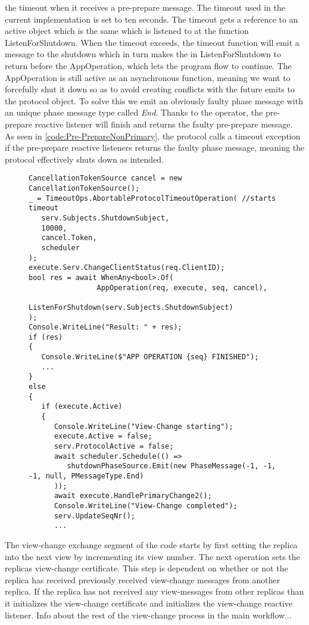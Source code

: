 the timeout when it receives a pre-prepare message. The timeout used in the current implementation is set to ten seconds. The timeout gets a reference to an active  object which is the same  which is listened to at the function ListenForShutdown. When the timeout exceeds, the timeout function will emit a message to the shutdown  which in turn makes the  in ListenForShutdown to return before the AppOperation, which lets the program flow to continue. The AppOperation is still active as an asynchronous function, meaning we want to forcefully shut it down so as to avoid creating conflicts with the future emits to the protocol  object. To solve this we emit an obviously faulty phase message with an unique phase message type called \emph{End}. Thanks to the  operator, the pre-prepare reactive listener will finish and returns the faulty pre-prepare message. As seen in \autoref{code:Pre-PrepareNonPrimary}, the protocol calls a timeout exception if the pre-prepare reactive listeners returns the faulty phase message, meaning the protocol effectively shuts down as intended.   
\begin{figure}[H]
	\centering
	\begin{lstlisting}[label = code:timeout, caption=Handling timeout for the normal protocol workflow and initiate View-Change, captionpos = b, basicstyle=\scriptsize]
CancellationTokenSource cancel = new CancellationTokenSource();
_ = TimeoutOps.AbortableProtocolTimeoutOperation( //starts timeout
   serv.Subjects.ShutdownSubject,
   10000,
   cancel.Token,
   scheduler
);
execute.Serv.ChangeClientStatus(req.ClientID);
bool res = await WhenAny<bool>.Of(
                AppOperation(req, execute, seq, cancel),
                ListenForShutdown(serv.Subjects.ShutdownSubject)
);
Console.WriteLine("Result: " + res);
if (res)
{
   Console.WriteLine($"APP OPERATION {seq} FINISHED");
   ...
}
else
{
   if (execute.Active)
   {
      Console.WriteLine("View-Change starting");
      execute.Active = false;
      serv.ProtocolActive = false;
      await scheduler.Schedule(() =>
         shutdownPhaseSource.Emit(new PhaseMessage(-1, -1, -1, null, PMessageType.End)
      ));
      await execute.HandlePrimaryChange2(); 
      Console.WriteLine("View-Change completed");
      serv.UpdateSeqNr();
      ...
    \end{lstlisting}
\end{figure} 
\fi
The view-change exchange segment of the code starts by first setting the replica into the next view by incrementing its view number. The next operation sets the replicas view-change certificate. This step is dependent on whether or not the replica has received previously received view-change messages from another replica. If the replica has not received any view-messages from other replicas than it initializes the view-change certificate and initializes the view-change reactive listener. Info about the rest of the view-change process in the main workflow...

